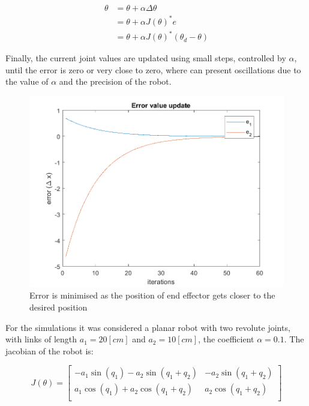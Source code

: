 \documentclass{article}
\begin{document}
\begin{equation}
\begin{aligned}
\theta & = \theta + \alpha\Delta\theta \\
& = \theta + \alpha J(\theta)^{*}e \\
&=  \theta + \alpha J(\theta)^{*}(\theta_d - \theta)
\end{aligned}
\end{equation}

Finally, the current joint values are updated using small steps, controlled by $\alpha$, until the error is zero or very close to zero, where can present oscillations  due to the value of $\alpha$ and the precision of the robot.

\begin{figure}[htbp] 
\begin{center}
\includegraphics[width=\textwidth]{images/error_p3_rodrigo}
\caption{Error is minimised as the position of end effector gets closer to the desired position}
\label{fig:part3.joint_trajectory}
\end{center}
\end{figure}

For the simulations it was considered a planar robot with two revolute joints, with links of length $a_1=20 [cm]$ and $a_2=10 [cm]$, the coefficient $\alpha = 0.1$. The jacobian of the robot is:

\begin{equation}
J(\theta) = \left[ \begin{array}{cc}
	-a_1\sin(q_1) - a_2\sin(q_1+q_2) & -a_2\sin(q_1+q_2) \\
        a_1\cos(q_1)+a_2\cos(q_1+q_2) & a_2\cos(q_1+q_2) \\
\end{array} \right] 
\end{equation}
\end{document}
